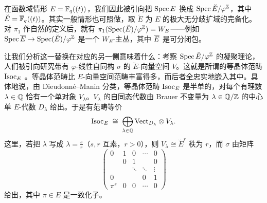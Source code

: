 在函数域情形 $E=\mathbb{F}_q((t))$，我们因此被引向把 $\operatorname{Spec} E$ 换成 $\operatorname{Spec}\breve{E}/\varphi^{\mathbb{Z}}$，其中 $\breve{E}=\overline{\mathbb{F}}_q((t))$。其实一般情形也可照做，取 $\breve{E}$ 为 $E$ 的极大无分歧扩域的完备化。对 $\pi_1$ 作自然的定义后，就有 $\pi_1(\operatorname{Spec}(\breve{E})/\varphi^{\mathbb{Z}})=W_E$——例如 $\operatorname{Spec}\overline{E}\to\operatorname{Spec}(\breve{E})/\varphi^{\mathbb{Z}}$ 是一个 $W_E$-主丛，其中 $\overline{E}$ 是可分闭包。

让我们分析这一替换在对应的另一侧意味着什么：考察 $\operatorname{Spec}\breve{E}/\varphi^{\mathbb{Z}}$ 的凝聚理论，人们被引向研究带有 $\varphi$-线性自同构 $\sigma$ 的 $\breve{E}$-向量空间 $V$。这就是所谓的等晶体范畴 $\mathrm{Isoc}_E$
。等晶体范畴比 $E$-向量空间范畴丰富得多，而后者全忠实地嵌入其中。具体地说，由 Dieudonné–Manin 分类，等晶体范畴 $\mathrm{Isoc}_E$ 是半单的，对每个有理数 $\lambda\in\mathbb{Q}$ 恰有一个单对象 $V_\lambda$。$V_\lambda$ 的自同态代数由 Brauer 不变量为 $\lambda\in\mathbb{Q}/\mathbb{Z}$ 的中心单 $E$-代数 $D_\lambda$ 给出。于是有范畴等价
\[
  \mathrm{Isoc}_E \;\cong\; \bigoplus_{\lambda\in\mathbb{Q}} \mathrm{Vect}_{D_\lambda}\otimes V_\lambda .
\]
这里，若把 $\lambda$ 写成 $\lambda=\frac{s}{r}$（$s,r$ 互素，$r>0$），则 $V_\lambda\cong\breve{E}^r$ 秩为 $r$，而 $\sigma$ 由矩阵
\[
  \begin{pmatrix}
    0 & 1 & 0 & \cdots & 0\\
      & 0 & 1 & & 0\\
      & & \ddots & \ddots & \vdots\\
    0 & & & 0 & 1\\
    \pi^s & 0 & 0 & \cdots & 0
  \end{pmatrix}
\]
给出，其中 $\pi\in E$ 是一致化子。


